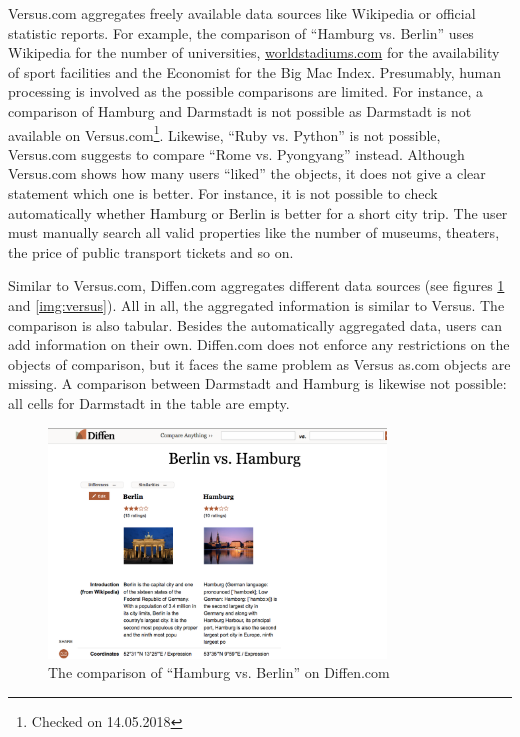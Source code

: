 Versus.com aggregates freely available data sources like Wikipedia or official statistic reports. For example, the comparison of \enquote{Hamburg vs. Berlin} uses Wikipedia for the number of universities, \url{worldstadiums.com} for the availability of sport facilities and the Economist for the Big Mac Index. Presumably, human processing is involved as the possible comparisons are limited. For instance, a comparison of Hamburg and Darmstadt is not possible as Darmstadt is not available on Versus.com\footnote{Checked on 14.05.2018}. Likewise, \enquote{Ruby vs. Python} is not possible, Versus.com suggests to compare \enquote{Rome vs. Pyongyang} instead. Although Versus.com shows how many users \enquote{liked} the objects, it does not give a clear statement which one is better. For instance, it is not possible to check automatically whether Hamburg or Berlin is better for a short city trip. The user must manually search all valid properties like the number of museums, theaters, the price of public transport tickets and so on.

Similar to Versus.com, Diffen.com aggregates different data sources (see figures \ref{img:diffen} and \ref{img:versus}). All in all, the aggregated information is similar to Versus. The comparison is also tabular. Besides the automatically aggregated data, users can add information on their own. Diffen.com does not enforce any restrictions on the objects of comparison, but it faces the same problem as Versus as.com objects are missing. A comparison between Darmstadt and Hamburg is likewise not possible: all cells for Darmstadt in the table are empty.

\begin{figure}[htp]
 \centering
	\includegraphics[width=0.8\textwidth]{images/ds-sys/diffen}
	\caption{The comparison of \enquote{Hamburg vs. Berlin} on Diffen.com}
		\label{img:diffen}
\end{figure}

